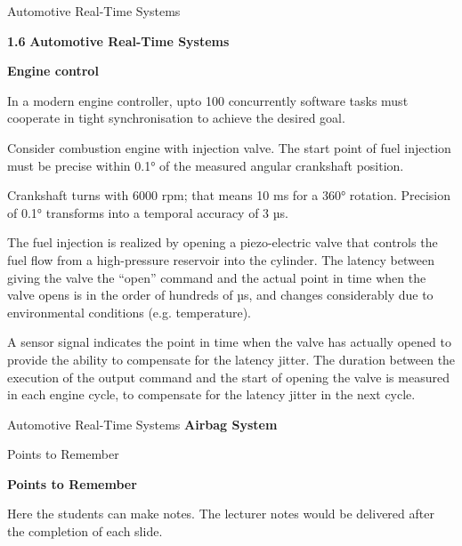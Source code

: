 \begin{frame}{Automotive Real-Time Systems}

\textbf{1.6} \protect\hypertarget{teil7}{}{}\textbf{Automotive Real-Time
Systems}

\textbf{Engine control}

In a modern engine controller, upto 100 concurrently software tasks must
cooperate in tight synchronisation to achieve the desired goal.

Consider combustion engine with injection valve. The start point of fuel
injection must be precise within 0.1° of the measured angular crankshaft
position.

Crankshaft turns with 6000 rpm; that means 10 ms for a 360° rotation.
Precision of 0.1° transforms into a temporal accuracy of 3 µs.

The fuel injection is realized by opening a piezo-electric valve that
controls the fuel flow from a high-pressure reservoir into the cylinder.
The latency between giving the valve the ``open'' command and the actual
point in time when the valve opens is in the order of hundreds of µs,
and changes considerably due to environmental conditions (e.g.
temperature).

A sensor signal indicates the point in time when the valve has actually
opened to provide the ability to compensate for the latency jitter. The
duration between the execution of the output command and the start of
opening the valve is measured in each engine cycle, to compensate for
the latency jitter in the next cycle.

\end{frame}

\begin{frame}{Automotive Real-Time Systems}
\textbf{Airbag System}

\end{frame}

\begin{frame}{Points to Remember}

\protect\hypertarget{teil8}{}{}\textbf{Points to Remember}

\protect\hypertarget{teil8-1}{}{\protect\hypertarget{teil8}{}{}}

Here the students can make notes. The lecturer notes would be delivered
after the completion of each slide.

\end{frame}

